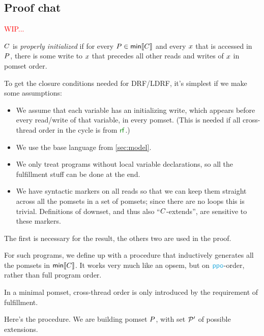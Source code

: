

\subsection{Proof chat}
  \textcolor{red}{WIP...}

  \begin{definition}
    $C$ is \emph{properly initialized} if for every
    $P\in\textsf{min}\llbracket C\rrbracket$ and every $x$ that is accessed in $P$,
    there is some write to $x$ that precedes all other reads and writes
    of $x$ in pomset order.
  \end{definition}
  
  To get the closure conditions needed for DRF/LDRF, it's simplest if we make
  some assumptions:
  \begin{itemize}
  \item We assume that each variable has an initializing write, which appears
    before every read/write of that variable, in every pomset.
    (This is needed if all cross-thread order in the cycle is from $\rrf$.)    
  \item We use the base language from \textsection\ref{sec:model}.
  \item We only treat programs without local variable declarations, so all
    the fulfillment stuff can be done at the end.
  \item We have syntactic markers on all reads so that we can keep them
    straight across all the pomsets in a set of pomsets; since there are no
    loops this is trivial.  Definitions of downset, and thus also
    ``$C$-extends'', are sensitive to these markers.
  \end{itemize}
  The first is necessary for the result, the others two are used in the proof.

  
  For such programs, we define up with a procedure that inductively generates
  all the pomsets in $\textsf{min}\llbracket C\rrbracket$.  It works very much like an opsem, but
  on $\rppo$-order, rather than full program order.

  In a minimal pomset, cross-thread order is only introduced by the
  requirement of fulfillment.

  Here's the procedure.  We are building pomset $P$, with set $\mathcal{P}'$ of
  possible extensions.  
  
